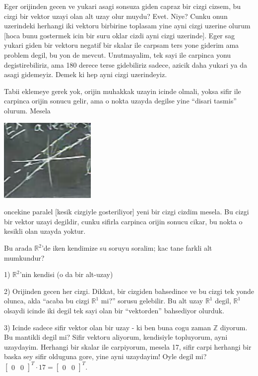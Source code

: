 \documentclass[12pt,fleqn]{article}\usepackage{../common}
\begin{document}
Eger orijinden gecen ve yukari asagi sonsuza giden capraz bir cizgi cizsem,
bu cizgi bir vektor uzayi olan alt uzay olur muydu? Evet. Niye? Cunku onun
uzerindeki herhangi iki vektoru birbirine toplasam yine ayni cizgi uzerine
olurum [hoca bunu gostermek icin bir suru oklar cizdi ayni cizgi
uzerinde]. Eger sag yukari giden bir vektoru negatif bir skalar ile carpsam
ters yone giderim ama problem degil, bu yon de mevcut. Unutmayalim, tek
sayi ile carpinca yonu degistirebiliriz, ama 180 derece terse gidebiliriz
sadece, azicik daha yukari ya da asagi gidemeyiz. Demek ki hep ayni cizgi
uzerindeyiz. 

Tabii eklemeye gerek yok, orijin muhakkak uzayin icinde olmali, yoksa sifir
ile carpinca orijin sonucu gelir, ama o nokta uzayda degilse yine ``disari
tasmis'' olurum. Mesela 

\includegraphics[height=4cm]{5_04.png}

oncekine paralel [kesik cizgiyle gosteriliyor] yeni bir cizgi cizdim
mesela. Bu cizgi bir vektor uzayi degildir, cunku sifirla carpinca orijin
sonucu cikar, bu nokta o kesikli olan uzayda yoktur.

Bu arada $\mathbb{R}^2$'de iken kendimize su soruyu soralim; kac tane
farkli alt mumkundur? 

1) $\mathbb{R}^2$'nin kendisi (o da bir alt-uzay)

2) Orijinden gecen her cizgi. Dikkat, bir cizgiden bahsedince ve bu cizgi
tek yonde olunca, akla ``acaba bu cizgi $\mathbb{R}^1$ mi?'' sorusu
gelebilir. Bu alt uzay $\mathbb{R}^1$ degil, $\mathbb{R}^1$ olsaydi icinde
iki degil tek sayi olan bir ``vektorden'' bahsediyor olurduk. 

3) Icinde sadece sifir vektor olan bir uzay - ki ben buna cogu zaman
$\mathbb{Z}$ diyorum. Bu mantikli degil mi? Sifir vektoru aliyorum,
kendisiyle topluyorum, ayni uzaydayim. Herhangi bir skalar ile carpiyorum,
mesela 17, sifir carpi herhangi bir baska sey sifir olduguna gore, yine
ayni uzaydayim! Oyle degil mi? $\left[\begin{array}{rr}0 &
    0\end{array}\right]^T \cdot 17 = \left[\begin{array}{rr}0 &
    0\end{array}\right]^T$.
\end{document}
